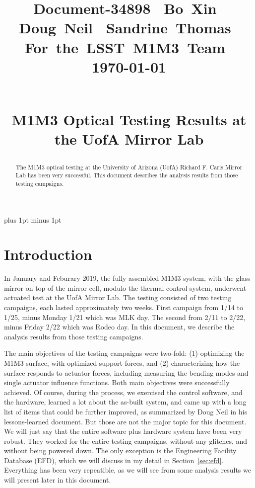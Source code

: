 \documentclass [twoside,openbib,12pt]{article}
\begin{document}
\normalsize
\parskip=5pt plus 1pt minus 1pt

\title{ \hfill\parbox{4cm}{\normalsize
                          \hbox{Document-34898          \hfill}
                          \hbox{Bo Xin          \hfill}
                          \hbox{Doug Neil         \hfill}
                          \hbox{Sandrine Thomas          \hfill}
                           \hbox{For the LSST M1M3 Team          \hfill}
                          \hbox{\today             \hfill}}\\[1cm]
{\bf
M1M3 Optical Testing Results at the UofA Mirror Lab
}
}
\author{}
\date{}

\maketitle
\begin{abstract}
  The M1M3 optical testing at the University of Arizona
  (UofA) Richard F. Caris Mirror Lab has
  been very successful.
This document describes the analysis results from those testing campaigns.
\end{abstract}

\tableofcontents


\section{Introduction}
\label{sec:intro}

In January and Feburary 2019, the fully assembled M1M3 system, with
the glass mirror on top of the mirror cell, modulo the thermal control
system, underwent actuated test at the UofA Mirror Lab.
The testing consisted of two testing campaigns, each lasted
approximately two weeks.
First campaign from 1/14 to 1/25, minus Monday 1/21 which was MLK day.
The second from 2/11 to 2/22, minus Friday 2/22 which was Rodeo day.
In this document, we describe the analysis results from those testing
campaigns.

The main objectives of the testing campaigns were two-fold:
(1) optimizing the M1M3 surface, with optimized support forces, and
(2) characterizing how the surface responds to actuator forces,
including measuring the bending modes and single actuator influence functions.
Both main objectives were successfully achieved.
Of course, during the process, we exercised the control software, and
the hardware, learned a lot about the as-built system, and came up with a long list of items that could be
further improved, as summarized by Doug Neil in his lessons-learned document.
But those are not the major topic for this document.
We will just say that the entire software plus hardware system have
been very robust.
They worked for the entire testing campaigns, without
any glitches, and without being powered down.
The only exception is the Engineering Facility Database (EFD), which
we will discuss in my detail in Section~\ref{sec:efd}.
Everything has been very
repeatible, as we will see from some analysis results we will present
later in this document.
\end{document}
